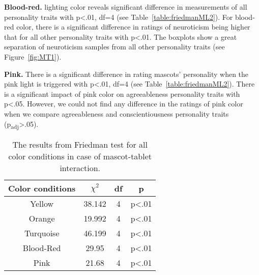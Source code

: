\par\textbf{Blood-red.}
lighting color reveals significant difference in measurements of all personality traits
with p<.01, df=4 (see Table~\ref{table:friedmanML2}).
For blood-red color, there is a significant difference in ratings of neuroticism
being higher that for all other personality traits with p<.01.
The boxplots show a great separation of neuroticism samples from all
other personality traits (see Figure~\ref{fig:MT1}).


\par\textbf{Pink.}
There is a significant difference in rating mascots' personality when the pink light is
triggered with p<.01, df=4 (see Table~\ref{table:friedmanML2}).
There is a significant impact of pink color on agreeableness personality traits with p<.05.
However, we could not find any difference in the ratings of pink color when
we compare agreeableness and conscientiousness personality traits (p\textsubscript{adj}>.05).


\begin{table}[H]
    \renewcommand{\arraystretch}{1}
    \begin{center}
        \begin{tabular}{|c|c|c|c|}
            \hline
            \textbf{Color conditions} & \textbf{$\chi^2$} & \textbf{df} & \textbf{p} \\
            \hline
            Yellow &38.142 &4 &p<.01 \\
            \hline
            Orange &19.992 &4 &p<.01 \\
            \hline
            Turquoise &46.199 &4 &p<.01 \\
            \hline
            Blood-Red &29.95 &4 &p<.01 \\
            \hline
            Pink &21.68 &4 &p<.01 \\
            \hline
        \end{tabular}
        \caption{The results from Friedman test for all color conditions in case of mascot-tablet interaction.}
        \label{table:friedmanMT2}
    \end{center}
\end{table}

